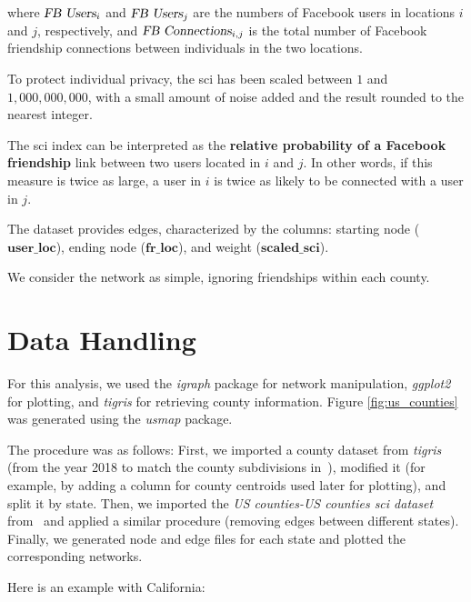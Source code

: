 where $\textsl{FB Users}_i$ and $\textsl{FB Users}_j$ are the numbers of Facebook users in locations $i$ and $j$, respectively, and $\textsl{FB Connections}_{i,j}$ is the total number of Facebook friendship connections between individuals in the two locations.

To protect individual privacy, the sci has been scaled between $1$ and $1,000,000,000$, with a small amount of noise added and the result rounded to the nearest integer.

The sci index can be interpreted as the \textbf{relative probability of a Facebook friendship} link between two users located in $i$ and $j$. In other words, if this measure is twice as large, a user in $i$ is twice as likely to be connected with a user in $j$.

The dataset provides edges, characterized by the columns: starting node ($\textbf{user\_loc}$), ending node ($\textbf{fr\_loc}$), and weight ($\textbf{scaled\_sci}$).

We consider the network as simple, ignoring friendships within each county.

\section{Data Handling}

For this analysis, we used the \textsl{igraph} package for network manipulation, \textsl{ggplot2} for plotting, and \textsl{tigris} for retrieving county information. Figure \ref{fig:us_counties} was generated using the \textsl{usmap} package.

The procedure was as follows: First, we imported a county dataset from \textsl{tigris} (from the year 2018 to match the county subdivisions in~\cite{bai2018sci}), modified it (for example, by adding a column for county centroids used later for plotting), and split it by state. Then, we imported the \textsl{US counties-US counties sci dataset} from~\cite{sciFacebook} and applied a similar procedure (removing edges between different states). Finally, we generated node and edge files for each state and plotted the corresponding networks.

Here is an example with California:

